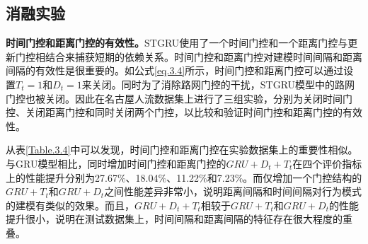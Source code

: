 \documentclass[master]{thesis-uestc}
\begin{document}
\subsection{消融实验}
\textbf{时间门控和距离门控的有效性。}STGRU使用了一个时间门控和一个距离门控与更新门控相结合来捕获短期的依赖关系。时间门控和距离门控对建模时间间隔和距离间隔的有效性是很重要的。如公式\ref{eq.3.4}所示，时间门控和距离门控可以通过设置$T_t=1$和$D_t=1$来关闭。同时为了消除路网门控的干扰，STGRU模型中的路网门控也被关闭。因此在名古屋人流数据集上进行了三组实验，分别为关闭时间门控、关闭距离门控和同时关闭两个门控，以比较和验证时间门控和距离门控的有效性。
\begin{table}[ht]
\caption{时间门控和距离门控对模型性能的影响}
\label{Table.3.4}
\centering
{}
\end{table}

从表\ref{Table.3.4}中可以发现，时间门控和距离门控在实验数据集上的重要性相似。与GRU模型相比，同时增加时间门控和距离门控的$GRU+D_t+T_t$在四个评价指标上的性能提升分别为27.67$\%$、18.04$\%$、11.22$\%$和7.23$\%$。而仅增加一个门控结构的$GRU+T_t$和$GRU+D_t$之间性能差异非常小，说明距离间隔和时间间隔对行为模式的建模有类似的效果。而且，$GRU+D_t+T_t$相较于$GRU+T_t$和$GRU+D_t$的性能提升很小，说明在测试数据集上，时间间隔和距离间隔的特征存在很大程度的重叠。
\end{document}
